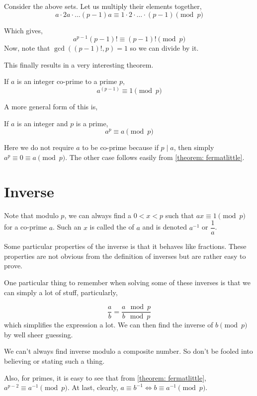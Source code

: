 Consider the above sets. Let us multiply their elements together,
\[a \cdot 2a \cdot \dots (p-1)a \equiv 1 \cdot 2 \cdot \dots \cdot (p-1) \pmod{p}\]

Which gives, 
\[a^{p-1}(p-1)! \equiv (p-1)! \pmod{p}\]
Now, note that \(\gcd((p-1)!, p) = 1\) so we can divide by it.

This finally results in a very interesting theorem. 

\begin{theorem}
    \label{theorem: fermatlittle}
    If \(a\) is an integer co-prime to a prime \(p\), 
    \[a^{(p-1)} \equiv 1 \pmod{p}\]
\end{theorem}

A more general form of this is, 

\begin{theorem}
    \label{theorem: fermatlittle2}
    If \(a\) is an integer and \(p\) is a prime, 
    \[a^{p} \equiv a \pmod{p}\]
\end{theorem}

Here we do not require \(a\) to be co-prime because if \(p \mid a\), then
simply \(a^p \equiv 0 \equiv a \pmod{p}\). The other case
follows easily from \cref{theorem: fermatlittle}.

\section{Inverse}

Note that modulo \(p\), we can always find a \(0 < x < p\) such that 
\(ax \equiv 1 \pmod{p}\) for a co-prime \(a\). Such 
an \(x\) is called the  of \(a\) and is denoted \(a^{-1}\) or \(\dfrac{1}{a}\).

Some particular properties of the inverse is that it behaves like fractions.
These properties are not obvious from the definition of inverses but are rather easy to prove.

One particular thing to remember when solving some of these inverses is that
we can simply a lot of stuff, particularly,

\[\frac{a}{b} = \frac{a \mod{p}}{b \mod{p}}\] which simplifies the expression a lot.
We can then find the inverse of \(b \pmod{p}\) by well sheer guessing.

We can't always find inverse modulo a composite number. So don't be fooled into believing or stating
such a thing.

Also, for primes, it is easy to see that from \cref{theorem: fermatlittle}, \(a^{p-2} \equiv a^{-1} \pmod{p}\).
At last, clearly, \(a \equiv b^{-1} \iff b \equiv a^{-1} \pmod{p}\). 

